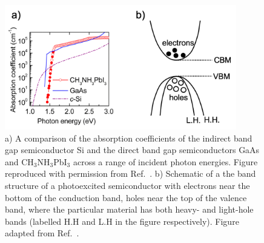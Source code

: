 \documentclass[11pt, twoside]{report}
\begin{document}
\begin{figure}[h!]
  \centering
    \includegraphics[width=0.9\textwidth]{figures/new_ab+m_eff.png}
    \caption[a) A comparison of the absorption coefficients of the indirect band gap semiconductor Si and the direct band gap semiconductors GaAs and CH$_3$NH$_3$PbI$_3$ across a range of incident photon energies. b) Schematic of a the band structure of a photoexcited semiconductor with electrons near the bottom of the conduction band, holes near the top of the valence band, where the particular material has both heavy- and light-hole bands (labelled H.H and L.H in the figure respectively).]{a) A comparison of the absorption coefficients of the indirect band gap semiconductor Si and the direct band gap semiconductors GaAs and CH$_3$NH$_3$PbI$_3$ across a range of incident photon energies. Figure reproduced with permission from Ref.~. b) Schematic of a the band structure of a photoexcited semiconductor with electrons near the bottom of the conduction band, holes near the top of the valence band, where the particular material has both heavy- and light-hole bands (labelled H.H and L.H in the figure respectively). Figure adapted from Ref.~.}
  \label{ab+m_eff}
\end{figure}
\end{document}
